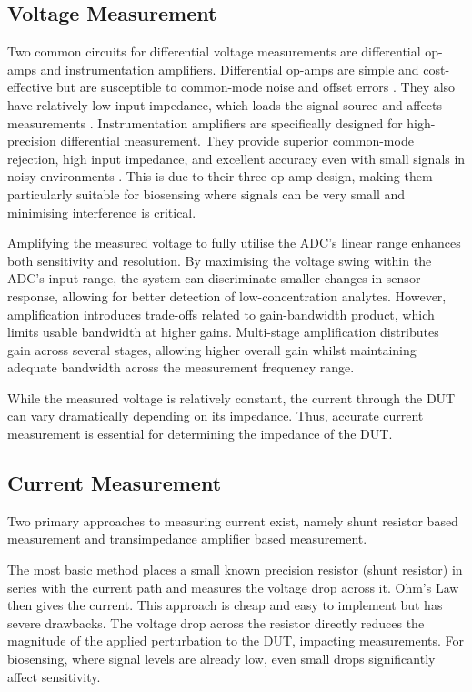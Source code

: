 \subsection{Voltage Measurement}\label{subsec:lit_review_v_meas}
Two common circuits for differential voltage measurements are differential op-amps and instrumentation amplifiers. Differential op-amps are simple and cost-effective but are susceptible to common-mode noise and offset errors \cite{technologyWhatAreDrawbacks2024}. They also have relatively low input impedance, which loads the signal source and affects measurements \cite{technologyWhatAreDrawbacks2024}. Instrumentation amplifiers are specifically designed for high-precision differential measurement. They provide superior common-mode rejection, high input impedance, and excellent accuracy even with small signals in noisy environments \cite{InstrumentationAmplifierOperational}. This is due to their three op-amp design, making them particularly suitable for biosensing where signals can be very small and minimising interference is critical.

Amplifying the measured voltage to fully utilise the \ac{ADC}'s linear range enhances both sensitivity and resolution. By maximising the voltage swing within the \ac{ADC}'s input range, the system can discriminate smaller changes in sensor response, allowing for better detection of low-concentration analytes. However, amplification introduces trade-offs related to gain-bandwidth product, which limits usable bandwidth at higher gains. Multi-stage amplification distributes gain across several stages, allowing higher overall gain whilst maintaining adequate bandwidth across the measurement frequency range.

While the measured voltage is relatively constant, the current through the \ac{DUT} can vary dramatically depending on its impedance. Thus, accurate current measurement is essential for determining the impedance of the \ac{DUT}.

\subsection{Current Measurement}
Two primary approaches to measuring current exist, namely shunt resistor based measurement and transimpedance amplifier based measurement.

The most basic method places a small known precision resistor (shunt resistor) in series with the current path and measures the voltage drop across it. Ohm's Law then gives the current. This approach is cheap and easy to implement but has severe drawbacks. The voltage drop across the resistor directly reduces the magnitude of the applied perturbation to the \ac{DUT}, impacting measurements. For biosensing, where signal levels are already low, even small drops significantly affect sensitivity.

